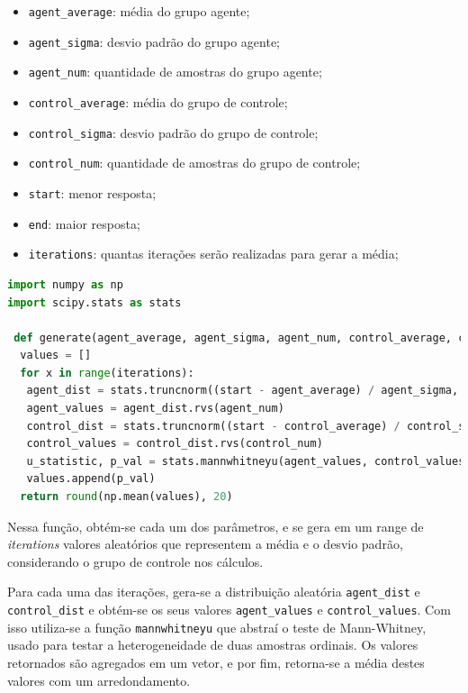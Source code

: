 \documentclass[12pt]{article}
\begin{document}
\begin{itemize}
	\item \texttt{agent\_average}: média do grupo agente;
	\item \texttt{agent\_sigma}: desvio padrão do grupo agente;
	\item \texttt{agent\_num}: quantidade de amostras do grupo agente;
	\item \texttt{control\_average}: média do grupo de controle;
	\item \texttt{control\_sigma}: desvio padrão do grupo de controle;
	\item \texttt{control\_num}: quantidade de amostras do grupo de controle;
	\item \texttt{start}: menor resposta;
	\item \texttt{end}: maior resposta;
	\item \texttt{iterations}: quantas iterações serão realizadas para gerar a média;
\end{itemize}

\begin{lstlisting}[caption={Definição da Função Genérica},language=python,captionpos=b,frame=single,label={code:1}]
import numpy as np
import scipy.stats as stats
 
 def generate(agent_average, agent_sigma, agent_num, control_average, control_sigma, control_num, start, end, iterations):
  values = []
  for x in range(iterations):
   agent_dist = stats.truncnorm((start - agent_average) / agent_sigma, (end - agent_average) / agent_sigma, loc=agent_average, scale=agent_sigma)
   agent_values = agent_dist.rvs(agent_num)
   control_dist = stats.truncnorm((start - control_average) / control_sigma, (end - control_average) / control_sigma, loc=control_average, scale=control_sigma)
   control_values = control_dist.rvs(control_num)
   u_statistic, p_val = stats.mannwhitneyu(agent_values, control_values)
   values.append(p_val)
  return round(np.mean(values), 20)
\end{lstlisting}

Nessa função, obtém-se cada um dos parâmetros, e se gera em um range de \textit{iterations} valores aleatórios que representem a média e o desvio padrão, considerando o grupo de controle nos cálculos.

Para cada uma das iterações, gera-se a distribuição aleatória \texttt{agent\_dist} e \texttt{control\_dist} e obtém-se os seus valores \texttt{agent\_values} e \texttt{control\_values}. Com isso utiliza-se a função \texttt{mannwhitneyu} que abstraí o teste de Mann-Whitney, usado para testar a heterogeneidade de duas amostras ordinais. Os valores retornados são agregados em um vetor, e por fim, retorna-se a média destes valores com um arredondamento.
\end{document}
